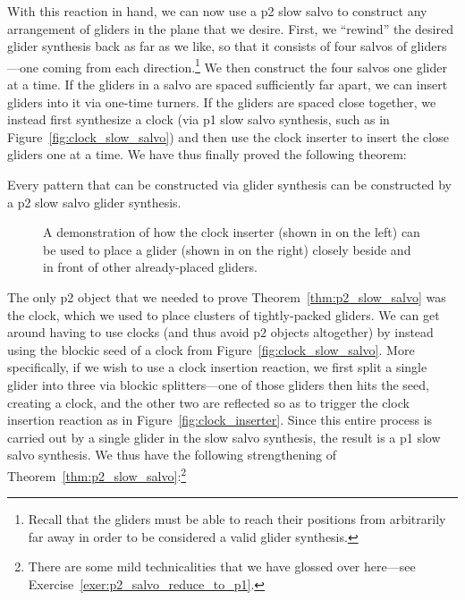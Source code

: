 With this reaction in hand, we can now use a p2 slow salvo to construct any arrangement of gliders in the plane that we desire. First, we ``rewind'' the desired glider synthesis back as far as we like, so that it consists of four salvos of gliders---one coming from each direction.\footnote{Recall that the gliders must be able to reach their positions from arbitrarily far away in order to be considered a valid glider synthesis.} We then construct the four salvos one glider at a time. If the gliders in a salvo are spaced sufficiently far apart, we can insert gliders into it via one-time turners. If the gliders are spaced close together, we instead first synthesize a clock (via p1 slow salvo synthesis, such as in Figure~\ref{fig:clock_slow_salvo}) and then use the clock inserter to insert the close gliders one at a time. We have thus finally proved the following theorem:

\begin{theorem}\label{thm:p2_slow_salvo}
	Every pattern that can be constructed via glider synthesis can be constructed by a p2 slow salvo glider synthesis.
\end{theorem}

\begin{figure}[!htb]
	\centering
	\caption{A demonstration of how the clock inserter (shown in  on the left) can be used to place a glider (shown in  on the right) closely beside and in front of other already-placed gliders.}\label{fig:clock_inserter_effective}
\end{figure}

The only p2 object that we needed to prove Theorem~\ref{thm:p2_slow_salvo} was the clock, which we used to place clusters of tightly-packed gliders. We can get around having to use clocks (and thus avoid p$2$ objects altogether) by instead using the blockic seed of a clock from Figure~\ref{fig:clock_slow_salvo}. More specifically, if we wish to use a clock insertion reaction, we first split a single glider into three via blockic splitters---one of those gliders then hits the seed, creating a clock, and the other two are reflected so as to trigger the clock insertion reaction as in Figure~\ref{fig:clock_inserter}. Since this entire process is carried out by a single glider in the slow salvo synthesis, the result is a p1 slow salvo synthesis. We thus have the following strengthening of Theorem~\ref{thm:p2_slow_salvo}:\footnote{There are some mild technicalities that we have glossed over here---see Exercise~\ref{exer:p2_salvo_reduce_to_p1}.}%

